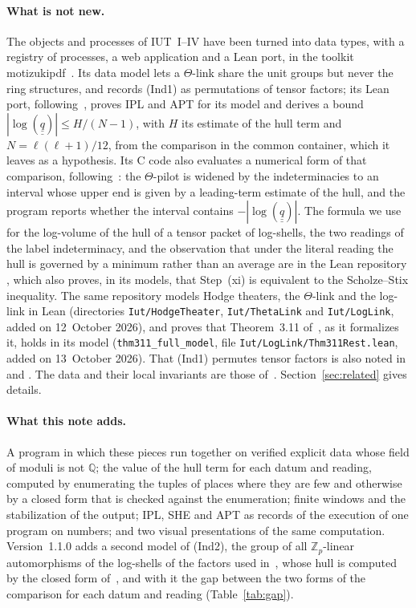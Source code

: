 \documentclass[11pt,a4paper]{article}
\newcommand{\qq}{\underline{\underline{q}}{}}
\newcommand{\Q}{\mathbb{Q}}
\newcommand{\Z}{\mathbb{Z}}
\begin{document}
\paragraph{What is not new.} The objects and processes of IUT~I--IV have been turned into data types, with a
registry of processes, a web application and a Lean port, in the toolkit motizukipdf~\cite{Richards}. Its data
model lets a $\Theta$-link share the unit groups but never the ring structures, and records (Ind1) as permutations
of tensor factors; its Lean port, following~\cite{Formal}, proves IPL and APT for its model and derives a bound
$|\log(\qq)|\le H/(N-1)$, with $H$ its estimate of the hull term and $N=\ell(\ell+1)/12$, from the comparison in the
common container, which it leaves as a hypothesis. Its C code also evaluates a numerical form of that comparison,
following~\cite[\S3.10]{EssLgc}: the $\Theta$-pilot is widened by the indeterminacies to an interval whose upper end
is given by a leading-term estimate of the hull, and the program reports whether the interval contains
$-|\log(\qq)|$. The formula we use for the log-volume of the hull of a tensor
packet of log-shells, the two readings of the label indeterminacy, and the observation that under the literal
reading the hull is governed by a minimum rather than an average are in the Lean repository \cite{LANAiut}, which
also proves, in its models, that Step~(xi) is equivalent to the Scholze--Stix inequality. The same repository models
Hodge theaters, the $\Theta$-link and the log-link in Lean (directories \nolinkurl{Iut/HodgeTheater},
\nolinkurl{Iut/ThetaLink} and \nolinkurl{Iut/LogLink}, added on 12~October 2026), and proves that Theorem~3.11
of~\cite{IUT3}, as it formalizes it, holds in its model (\nolinkurl{thm311_full_model}, file
\nolinkurl{Iut/LogLink/Thm311Rest.lean}, added on 13~October 2026). That (Ind1) permutes
tensor factors is also noted in \cite[\S4]{DH1} and \cite[\S6.2, footnote~7]{DH}. The data and their local
invariants are those of~\cite{Cat}. Section~\ref{sec:related} gives details.

\paragraph{What this note adds.} A program in which these pieces run together on verified explicit data whose
field of moduli is not $\Q$; the value of the hull term for each datum and reading, computed by enumerating the
tuples of places where they are few and otherwise by a closed form that is checked against the enumeration; finite
windows and the stabilization of the output; IPL, SHE and APT as records of the execution of one program on
numbers; and two visual presentations of the same computation. Version~1.1.0 adds a second model of (Ind2), the
group of all $\Z_p$-linear automorphisms of the log-shells of the factors used in~\cite{LANAiut}, whose hull is
computed by the closed form of~\cite{Gap}, and with it the gap between the two forms of the comparison for each
datum and reading (Table~\ref{tab:gap}).
\end{document}

